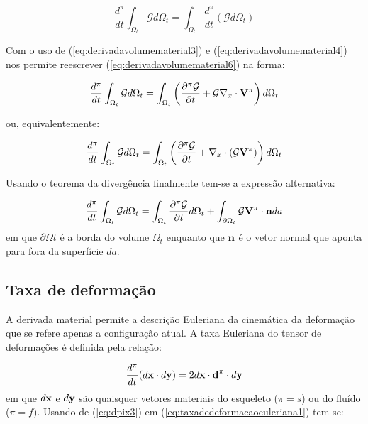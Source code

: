\documentclass[
	11pt, %
	fleqn, %
	a4paper, %
]{LegrandOrangeBook}
\begin{document}
\begin{equation}
	\label{eq:derivadavolumematerial6}	
	\dfrac{d^\pi}{dt}\int_{\Omega_t}\mathcal{G}d\Omega_t = \int_{\Omega_t}\dfrac{d^\pi}{dt}(\mathcal{G}d\Omega_t)
\end{equation}

Com o uso de (\ref{eq:derivadavolumematerial3}) e (\ref{eq:derivadavolumematerial4}) nos permite reescrever (\ref{eq:derivadavolumematerial6}) na forma:

\begin{equation}
	\label{eq:derivadavolumematerial7}	
	\dfrac{d^\pi}{dt}\int_{\Omega_t}\mathcal{G}d\Omega_t = \int_{\Omega_t}\left(\dfrac{\partial^\pi \mathcal{G}}{\partial t}+\mathcal{G}\nabla_x \cdot \textbf{V}^{\pi}\right)d\Omega_t
\end{equation}

ou, equivalentemente:

\begin{equation}
	\label{eq:derivadavolumematerial8}	
	\dfrac{d^\pi}{dt}\int_{\Omega_t}\mathcal{G}d\Omega_t = \int_{\Omega_t}\left(\dfrac{\partial^\pi \mathcal{G}}{\partial t}+\nabla_x \cdot (\mathcal{G}\textbf{V}^{\pi})\right)d\Omega_t
\end{equation}

Usando o teorema da divergência finalmente tem-se a expressão alternativa:

\begin{equation}
	\label{eq:derivadavolumematerial9}	
	\dfrac{d^\pi}{dt}\int_{\Omega_t}\mathcal{G}d\Omega_t = \int_{\Omega_t}\dfrac{\partial^\pi \mathcal{G}}{\partial t}d\Omega_t+\int_{\partial \Omega_t} \mathcal{G}\textbf{V}^{\pi} \cdot \textbf{n} da
\end{equation}
em que $\partial \Omega t$ é a borda do volume $\Omega_t$ enquanto que $\textbf{n}$ é o vetor normal que aponta para fora da superfície $da$.

\subsection{Taxa de deformação}

A derivada material permite a descrição Euleriana da cinemática da deformação que se refere apenas a configuração atual. A taxa Euleriana do tensor de deformações é definida pela relação:

\begin{equation}
	\label{eq:taxadedeformacaoeuleriana1}	
	\dfrac{d^\pi}{dt}(d\textbf{x} \cdot d\textbf{y}) = 2d\textbf{x} \cdot \textbf{d}^{\pi} \cdot d\textbf{y}
\end{equation}
em que $d\textbf{x}$ e $d\textbf{y}$ são quaisquer vetores materiais do esqueleto ($\pi = s$) ou do fluído ($\pi = f$). Usando de (\ref{eq:dpix3}) em (\ref{eq:taxadedeformacaoeuleriana1}) tem-se: 
\end{document}
